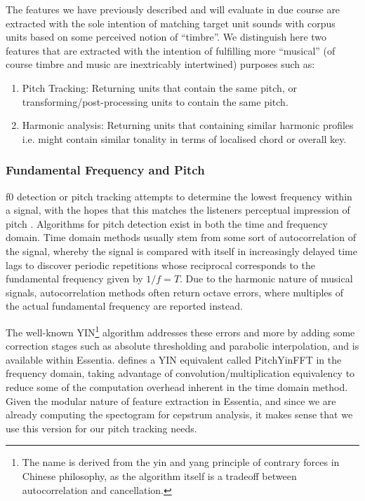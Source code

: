 {{{{The features we have previously described and will evaluate in due course are extracted with the sole intention of matching target unit sounds with corpus units based on some perceived notion of ``timbre''. We distinguish here two features that are extracted with the intention of fulfilling more ``musical'' (of course timbre and music are inextricably intertwined) purposes such as:

\begin{enumerate}
  \item Pitch Tracking: Returning units that contain the same pitch, or transforming/post-processing units to contain the same pitch.
  \item Harmonic analysis: Returning units that containing similar harmonic profiles i.e. might contain similar tonality in terms of localised chord or overall key.
\end{enumerate}


\subsubsection{Fundamental Frequency and Pitch}

\acrfull{f0} detection or pitch tracking attempts to determine the lowest frequency within a signal, with the hopes that this matches the listeners perceptual impression of pitch \citep{Gerhard2003}. Algorithms for pitch detection exist in both the time and frequency domain. Time domain methods usually stem from some sort of autocorrelation of the signal, whereby the signal is compared with itself in increasingly delayed time lags to discover periodic repetitions whose reciprocal corresponds to the fundamental frequency given by $1/f = T$. Due to the harmonic nature of musical signals, autocorrelation methods often return octave errors, where multiples of the actual fundamental frequency are reported instead.

The well-known YIN\footnote{The name is derived from the yin and yang principle of contrary forces in Chinese philosophy, as the algorithm itself is a tradeoff between autocorrelation and cancellation.} algorithm \citep{DeCheveigne2002} addresses these errors and more by adding some correction stages such as absolute thresholding and parabolic interpolation, and is available within Essentia. \cite{Brossier2006} defines a YIN equivalent called PitchYinFFT in the frequency domain, taking advantage of convolution/multiplication equivalency to reduce some of the computation overhead inherent in the time domain method. Given the modular nature of feature extraction in Essentia, and since we are already computing the spectogram for cepstrum analysis, it makes sense that we use this version for our pitch tracking needs.

}}}}
